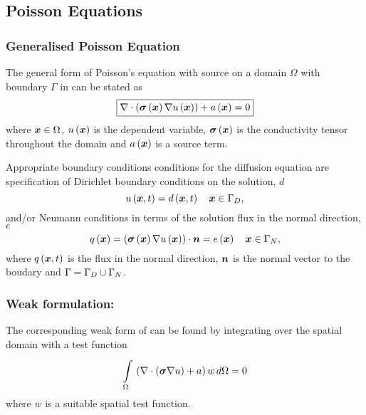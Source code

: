 \subsection{Poisson Equations} 

\subsubsection{Generalised Poisson Equation} 


The general form of Poisson's equation with source on a domain $\Omega$ with boundary
$\Gamma$ in \OpenCMISS can be stated as
\begin{equation}
  \boxed{
    \divergence{}{\pbrac{\fnof{\tensor{\sigma}}{\vectr{x}}\gradient{}{\fnof{u}{\vectr{x}}}}}+
    \fnof{a}{\vectr{x}}=0
  }
  \label{eqn:Poissonequation}
\end{equation}
where $\boldsymbol{x}\in\Omega$, $ u\left( \boldsymbol{x} \right) $ is the dependent variable, 
$ \boldsymbol{\mathit{\sigma}}\left( \boldsymbol{x} \right) $ is the conductivity tensor throughout 
the domain and $ a\left( \boldsymbol{x} \right) $ is a source term.

Appropriate boundary conditions conditions for the diffusion
equation are specification of Dirichlet boundary conditions on the solution,
$d$ \ie
\begin{equation}
  \fnof{u}{\vectr{x},t} = \fnof{d}{\vectr{x},t} \quad \vectr{x}\in\Gamma_{D},
  \label{eqn:PoissonDirichletBC} 
\end{equation}
and/or Neumann conditions in terms of the solution flux in the normal
direction, $e$ \ie
\begin{equation}
  \fnof{q}{\vectr{x}} = \dotprod{\pbrac{\fnof{\tensor{\sigma}}{\vectr{x}}
      \gradient{}{\fnof{u}{\vectr{x}}}}}{\normal} =
  \fnof{e}{\vectr{x}} \quad \vectr{x}\in\Gamma_{N},
  \label{eqn:PoissonNeumannBC} 
\end{equation}
where $ q\left( \boldsymbol{x},t \right) $ is the flux in the normal direction, $\boldsymbol{n}$ is the normal
vector to the boudary and $\Gamma=\Gamma_{D}\cup\Gamma_{N}$.

\subsubsection{Weak formulation:}

The corresponding weak form of  can be found by
integrating over the spatial domain with a test function \ie
\begin{equation}
  \gint{\Omega}{}{\pbrac{\divergence{}{\pbrac{\tensor{\sigma}\gradient{}{u}}}+a}w}{\Omega}=0
  \label{eqn:Poissonweakform1}
\end{equation}
where $w$ is a suitable spatial test function.


